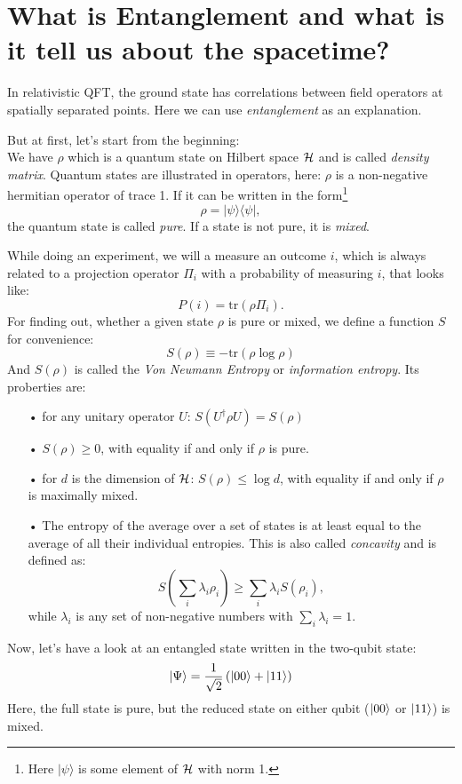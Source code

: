 \section{What is Entanglement and what is it tell us about the spacetime? \checkmark}
	In relativistic QFT, the ground state has correlations between field operators at spatially separated points. Here we can use \textit{entanglement} as an explanation.
	
	But at first, let's start from the beginning:
	\\
	We have $\rho$ which is a quantum state on Hilbert space $\mathcal{H}$ and is called \textit{density matrix}. Quantum states are illustrated in operators, here: $\rho$ is a non-negative hermitian operator of trace 1. If it can be written in the form\footnote{Here $|\psi\rangle$ is some element of $\mathcal{H}$ with norm 1.}
		\begin{equation}
			\rho=|\psi\rangle \langle\psi|,
		\end{equation}
	 the quantum state is called \textit{pure}. If a state is not pure, it is \textit{mixed}.
	 
	 While doing an experiment, we will a measure an outcome $i$, which is always related to a projection operator $\Pi_i$ with a probability of measuring $i$, that looks like: 
		 \begin{equation}
	 		P(i)=\mathrm{tr}(\rho\Pi_i).
	 	\end{equation}
	 For finding out, whether a given state $\rho$ is pure or mixed, we define a function $S$ for convenience:
		\begin{equation}
			S(\rho)\equiv -\mathrm{tr}(\rho \log \rho)
		\end{equation}	 	
	And $S(\rho)$ is called the \textit{Von Neumann Entropy} or \textit{information entropy}. 
	Its proberties are:
	\FloatBarrier
	\begin{itemize}
		\item[•] for any unitary operator $U$: $S(U^\dagger \rho U)=S(\rho)$
		\item[•] $S(\rho)\geq 0$, with equality if and only if $\rho$ is pure. 
		\item[•] for $d$ is the dimension of $\mathcal{H}$: $S(\rho)\leq \log d$, with equality if and only if $\rho$ is maximally mixed.
		\item[•] The entropy of the average over a set of states is at least equal to the average of all their individual entropies. This is also called \textit{concavity} and is defined as:
		\begin{equation}
			S \left(\sum_i \lambda_i \rho_i \right) \geq \sum_i \lambda_i S(\rho_i),
		\end{equation}
			while $\lambda_i$ is any set of non-negative numbers with $\sum_i \lambda_i =1$.
	\end{itemize}
	\FloatBarrier
	Now, let's have a look at an entangled state written in the two-qubit state:
		\begin{equation}
			|\Psi\rangle = \frac{1}{\sqrt{2}} \left(\ket{00} + \ket{11} \right)
		\end{equation}
	Here, the full state is pure, but the reduced state on either qubit ($\ket{00}$ or $\ket{11}$) is mixed. \\
	
